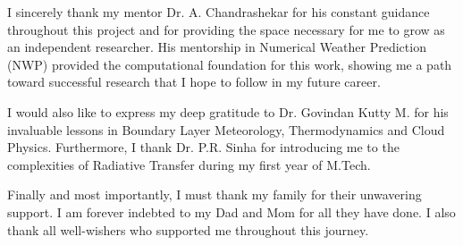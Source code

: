 
\begin{acknowledgements}
  I sincerely thank my mentor Dr. A. Chandrashekar for his constant
  guidance throughout this project and for providing the space
  necessary for me to grow as an independent researcher. His
  mentorship in Numerical Weather Prediction (NWP) provided the
  computational foundation for this work, showing me a path toward
  successful research that I hope to follow in my future career.

  I would also like to express my deep gratitude to Dr. Govindan
  Kutty M. for his invaluable lessons in Boundary Layer Meteorology,
  Thermodynamics and Cloud Physics. Furthermore, I thank Dr. P.R.
  Sinha for introducing me to the complexities of Radiative Transfer
  during my first year of M.Tech.


  Finally and most importantly, I must thank my family for their
  unwavering support. I am forever indebted to my Dad and Mom for all
  they have done. I also thank all well-wishers who supported me
  throughout this journey.
\end{acknowledgements}
